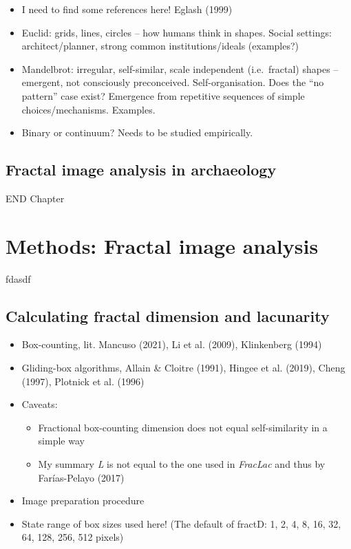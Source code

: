 \documentclass[
  12pt,
]{book}
\begin{document}
\begin{itemize}
\item
  I need to find some references here! Eglash (1999)
\item
  Euclid: grids, lines, circles -- how humans think in shapes. Social settings: architect/planner, strong common institutions/ideals (examples?)
\item
  Mandelbrot: irregular, self-similar, scale independent (i.e.~fractal) shapes -- emergent, not consciously preconceived. Self-organisation. Does the ``no pattern'' case exist? Emergence from repetitive sequences of simple choices/mechanisms. Examples.
\item
  Binary or continuum? Needs to be studied empirically.
\end{itemize}

\hypertarget{image-archaeo}{%
\section{Fractal image analysis in archaeology}\label{image-archaeo}}

END Chapter

\hypertarget{images-methods}{%
\chapter{Methods: Fractal image analysis}\label{images-methods}}

fdasdf

\hypertarget{calculating-fractal-dimension-and-lacunarity}{%
\section{Calculating fractal dimension and lacunarity}\label{calculating-fractal-dimension-and-lacunarity}}

\begin{itemize}
\item
  Box-counting, lit. Mancuso (2021), Li et al. (2009), Klinkenberg (1994)
\item
  Gliding-box algorithms, Allain \& Cloitre (1991), Hingee et al. (2019), Cheng (1997), Plotnick et al. (1996)
\item
  Caveats:

  \begin{itemize}
  \item
    Fractional box-counting dimension does not equal self-similarity in a simple way
  \item
    My summary \emph{L} is not equal to the one used in \emph{FracLac} and thus by Farías-Pelayo (2017)
  \end{itemize}
\item
  Image preparation procedure
\item
  State range of box sizes used here! (The default of fractD: 1, 2, 4, 8, 16, 32, 64, 128, 256, 512 pixels)
\end{itemize}
\end{document}
